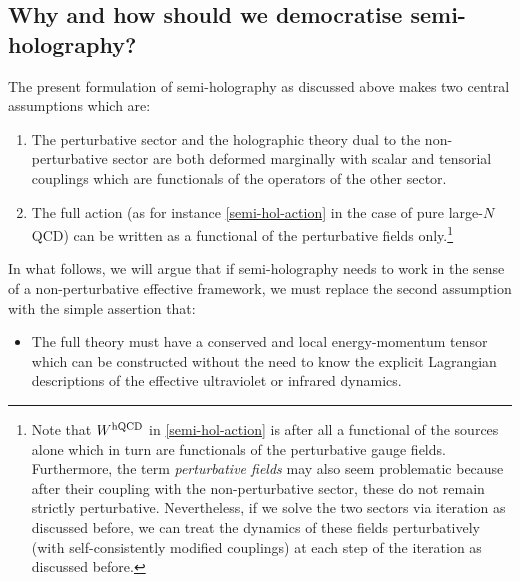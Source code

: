 \documentclass[prd,reprint,a4paper,showpacs,superscriptaddress,11pt,onecolumn,nofootinbib]{revtex4-1}
\renewcommand{\(}{\left(}
\renewcommand{\)}{\right)}
\newcommand{\6}{\partial}
\begin{document}
\subsection{Why and how should we democratise semi-holography?}\label{whyandhow}

The present formulation of semi-holography as discussed above makes two central assumptions which are:
\begin{enumerate}
\item The perturbative sector and the holographic theory dual to the non-perturbative sector are both deformed marginally with scalar and tensorial couplings which are functionals of the operators of the other sector.
\item The full action (as for instance \eqref{semi-hol-action} in the case of pure large-$N$ QCD) can be written as a functional of the perturbative fields only.\footnote{Note that $W^{\rm hQCD}$ in \eqref{semi-hol-action} is after all a functional of the sources alone which in turn are functionals of the perturbative gauge fields. Furthermore, the term \textit{perturbative fields} may also seem problematic because after their coupling with the non-perturbative sector, these do not remain strictly perturbative. Nevertheless, if we solve the two sectors via iteration as discussed before, we can treat the dynamics of these fields perturbatively (with self-consistently modified couplings) at each step of the iteration as discussed before.}
\end{enumerate}
In what follows, we will argue that if semi-holography needs to work in the sense of a non-perturbative effective framework, we must replace the second assumption with the simple assertion that:
\begin{itemize}
\item The full theory must have a conserved and local energy-momentum tensor which can be constructed without the need to know the explicit Lagrangian descriptions of the effective ultraviolet or infrared dynamics.
\end{itemize}
\end{document}

